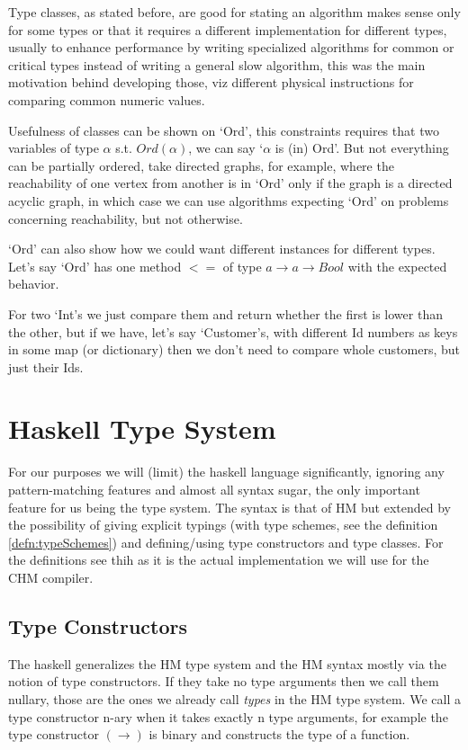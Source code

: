 Type classes, as stated before, are good for stating an algorithm makes sense only for some types or that it requires a different implementation for different types, usually to enhance performance by writing specialized algorithms for common or critical types instead of writing a general slow algorithm, this was the main motivation behind developing those, %
viz different physical instructions for comparing common numeric values.

Usefulness of classes can be shown on `Ord', this constraints requires that two variables of type $\alpha$ s.t. $Ord(\alpha)$, we can say `$\alpha$ is (in) Ord'. But not everything can be partially ordered, take directed graphs, for example, where the reachability of one vertex from another is in `Ord' only if the graph is a directed acyclic graph, in which case we can use algorithms expecting `Ord' on problems concerning reachability, but not otherwise.

`Ord' can also show how we could want different instances for different types. Let's say `Ord' has one method $<=$ of type $a \rightarrow a \rightarrow Bool$ with the expected behavior. %

For two `Int's we just compare them and return whether the first is lower than the other, but if we have, let's say `Customer's, with different Id numbers as keys in some map (or dictionary) then we don't need to compare whole customers, but just their Ids.

\section{Haskell Type System}

For our purposes we will (limit) the haskell language significantly, ignoring any pattern-matching features and almost all syntax sugar, the only important feature for us being the type system. The syntax is that of HM but extended by the possibility of giving explicit typings (with type schemes, see the definition \ref{defn:typeSchemes}) and defining/using type constructors and type classes. For the  definitions see thih \cite{jones1999typing} as it is the actual implementation we will use for the CHM compiler.

\subsection{Type Constructors}

The haskell generalizes the HM type system and the HM syntax mostly via the notion of type constructors. If they take no type arguments then we call them nullary, those are the ones we already call \emph{types} in the HM type system. We call a type constructor n-ary when it takes exactly n type arguments, for example the type constructor $(\rightarrow)$ is binary and constructs the type of a function. %

